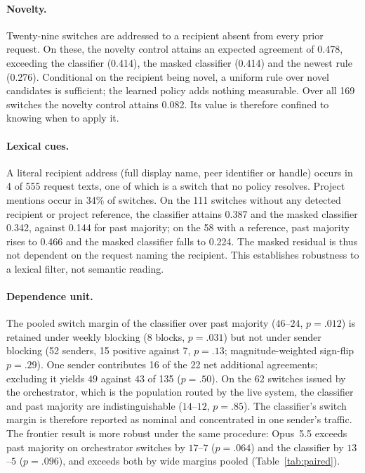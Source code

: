 \documentclass[11pt]{article}
\theoremstyle{definition}
\begin{document}
\paragraph{Novelty.}
Twenty-nine switches are addressed to a recipient absent from every prior request. On these, the novelty control attains an expected agreement of 0.478, exceeding the classifier (0.414), the masked classifier (0.414) and the newest rule (0.276). Conditional on the recipient being novel, a uniform rule over novel candidates is sufficient; the learned policy adds nothing measurable. Over all 169 switches the novelty control attains 0.082. Its value is therefore confined to knowing when to apply it.

\paragraph{Lexical cues.}
A literal recipient address (full display name, peer identifier or handle) occurs in 4 of 555 request texts, one of which is a switch that no policy resolves. Project mentions occur in 34\% of switches. On the 111 switches without any detected recipient or project reference, the classifier attains 0.387 and the masked classifier 0.342, against 0.144 for past majority; on the 58 with a reference, past majority rises to 0.466 and the masked classifier falls to 0.224. The masked residual is thus not dependent on the request naming the recipient. This establishes robustness to a lexical filter, not semantic reading.

\paragraph{Dependence unit.}
\label{sec:dependence}
The pooled switch margin of the classifier over past majority ($46$--$24$, $p = .012$) is retained under weekly blocking (8 blocks, $p = .031$) but not under sender blocking (52 senders, 15 positive against 7, $p = .13$; magnitude-weighted sign-flip $p = .29$). One sender contributes 16 of the 22 net additional agreements; excluding it yields $49$ against $43$ of 135 ($p = .50$). On the 62 switches issued by the orchestrator, which is the population routed by the live system, the classifier and past majority are indistinguishable ($14$--$12$, $p = .85$). The classifier's switch margin is therefore reported as nominal and concentrated in one sender's traffic. The frontier result is more robust under the same procedure: Opus~5.5 exceeds past majority on orchestrator switches by $17$--$7$ ($p = .064$) and the classifier by $13$--$5$ ($p = .096$), and exceeds both by wide margins pooled (Table~\ref{tab:paired}).
\end{document}

